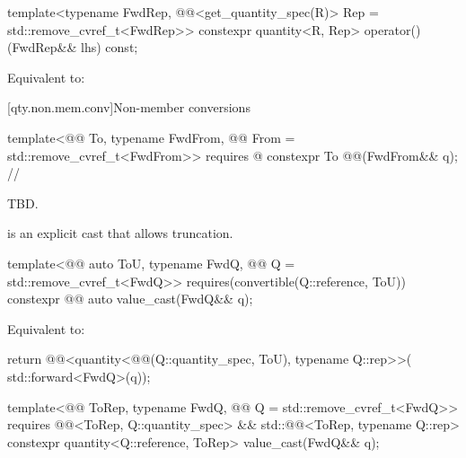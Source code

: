 \begin{itemdecl}
template<typename FwdRep,
         @@<get_quantity_spec(R{})> Rep = std::remove_cvref_t<FwdRep>>
constexpr quantity<R{}, Rep> operator()(FwdRep&& lhs) const;
\end{itemdecl}

\begin{itemdescr}
\pnum
\effects
Equivalent to:
\end{itemdescr}

[qty.non.mem.conv]{Non-member conversions}

\begin{itemdecl}
template<@@ To, typename FwdFrom, @@ From = std::remove_cvref_t<FwdFrom>>
  requires @\seebelownc@
constexpr To @@(FwdFrom&& q);  // \expos
\end{itemdecl}

\begin{itemdescr}
\pnum
\returns
TBD.
\end{itemdescr}

\pnum
{} is an explicit cast that allows truncation.

\begin{itemdecl}
template<@@ auto ToU, typename FwdQ, @@ Q = std::remove_cvref_t<FwdQ>>
  requires(convertible(Q::reference, ToU))
constexpr @@ auto value_cast(FwdQ&& q);
\end{itemdecl}

\begin{itemdescr}
\pnum
\effects
Equivalent to:
\begin{codeblock}
return @@<quantity<@@(Q::quantity_spec, ToU), typename Q::rep>>(
  std::forward<FwdQ>(q));
\end{codeblock}
\end{itemdescr}

\begin{itemdecl}
template<@@ ToRep, typename FwdQ, @@ Q = std::remove_cvref_t<FwdQ>>
  requires @@<ToRep, Q::quantity_spec> &&
           std::@@<ToRep, typename Q::rep>
constexpr quantity<Q::reference, ToRep> value_cast(FwdQ&& q);
\end{itemdecl}

